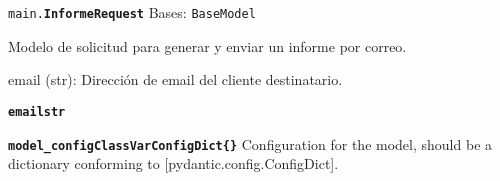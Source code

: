 \documentclass[a4paper,11pt,spanish]{sphinxmanual}
\newcommand{\robotoMonoBold}{\fontseries{b}\selectfont\ttfamily}
\renewcommand{\sphinxcode}[1]{\textcolor{sphinxorangeCode}{{\robotoMonoBold #1}}}
\renewcommand{\sphinxbfcode}[1]{\textbf{\sphinxcode{#1}}}
\renewcommand{\sphinxupquote}[1]{\texttt{#1}}
\begin{document}
\begin{fulllineitems}
\label{\detokenize{modelos:main.InformeRequest}}
\pysigstartsignatures
\pysiglinewithargsret
{\sphinxbfcode{\sphinxupquote{}}\sphinxcode{\sphinxupquote{main.}}\sphinxbfcode{\sphinxupquote{InformeRequest}}}
{\sphinxparamcomma {}}
{}
\pysigstopsignatures
\sphinxAtStartPar
Bases: \sphinxcode{\sphinxupquote{BaseModel}}

\sphinxAtStartPar
Modelo de solicitud para generar y enviar un informe por correo.
\begin{description}
\sphinxAtStartPar
email (str): Dirección de email del cliente destinatario.

\end{description}

\begin{fulllineitems}
\label{\detokenize{modelos:main.InformeRequest.email}}
\pysigstartsignatures
\pysigline
{\sphinxbfcode{\sphinxupquote{email}}\sphinxbfcode{\sphinxupquote{str}}}
\pysigstopsignatures
\end{fulllineitems}


\begin{fulllineitems}
\label{\detokenize{modelos:main.InformeRequest.model_config}}
\pysigstartsignatures
\pysigline
{\sphinxbfcode{\sphinxupquote{model\_config}}\sphinxbfcode{\sphinxupquote{ClassVar\DUrole{p}{{[}}ConfigDict\DUrole{p}{{]}}}}\sphinxbfcode{\sphinxupquote{\DUrole{w}{ }\{\}}}}
\pysigstopsignatures
\sphinxAtStartPar
Configuration for the model, should be a dictionary conforming to {[}\sphinxtitleref{ConfigDict}{]}{[}pydantic.config.ConfigDict{]}.

\end{fulllineitems}


\end{fulllineitems}

\end{document}
